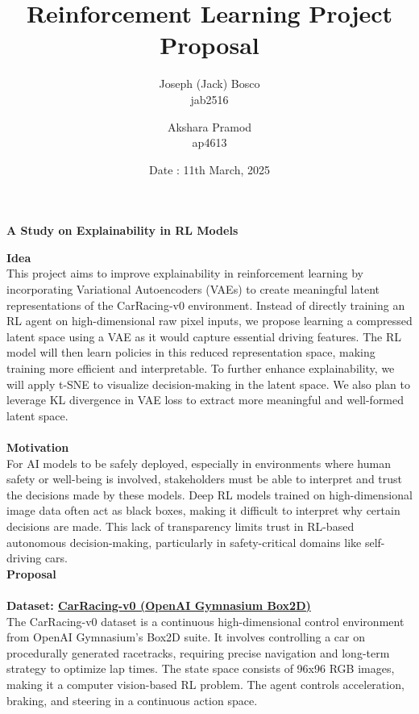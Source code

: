 \documentclass[12pt]{article}
\begin{document}
\title{\textbf{Reinforcement Learning Project Proposal}}

\author{Joseph (Jack) Bosco \\ jab2516  \and Akshara Pramod \\ ap4613}
\date{Date : 11th March, 2025}

\maketitle 

\begin{center}
    {\large \textbf{A Study on Explainability in RL Models}}
\end{center}

\noindent \textbf{Idea}\\
This project aims to improve explainability in reinforcement learning by incorporating Variational Autoencoders (VAEs) to create meaningful latent representations of the CarRacing-v0 environment. Instead of directly training an RL agent on high-dimensional raw pixel inputs, we propose learning a compressed latent space using a VAE as it would capture essential driving features. The RL model will then learn policies in this reduced representation space, making training more efficient and interpretable. To further enhance explainability, we will apply t-SNE to visualize decision-making in the latent space. We also plan to leverage KL divergence in VAE loss to extract more meaningful and well-formed latent space.\\
\\
\noindent \textbf{Motivation} \\
For AI models to be safely deployed, especially in environments where human safety or well-being is involved, stakeholders must be able to interpret and trust the decisions made by these models. Deep RL models trained on high-dimensional image data often act as black boxes, making it difficult to interpret why certain decisions are made. This lack of transparency limits trust in RL-based autonomous decision-making, particularly in safety-critical domains like self-driving cars.  
\\

\noindent \textbf{Proposal}\\
\\

\noindent \textbf{Dataset: \href{https://gymnasium.farama.org/environments/box2d/car_racing/}{CarRacing-v0 (OpenAI Gymnasium Box2D)}}\\
The CarRacing-v0 dataset is a continuous high-dimensional control environment from OpenAI Gymnasium’s Box2D suite. It involves controlling a car on procedurally generated racetracks, requiring precise navigation and long-term strategy to optimize lap times. The state space consists of 96x96 RGB images, making it a computer vision-based RL problem. The agent controls acceleration, braking, and steering in a continuous action space.
\end{document}
